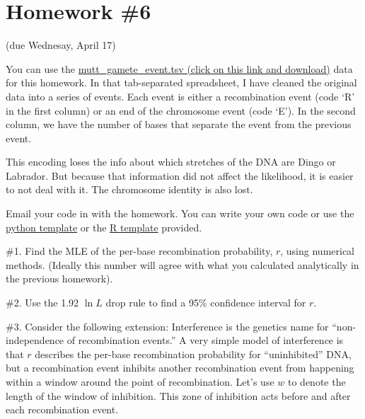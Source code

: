 \documentclass[11pt]{article}
\newcommand{\href}[2]{\url{#2}}
\begin{document}
\section*{Homework \#6} (due Wednesay, April 17)

You can use the \href{https://github.com/mtholder/likelihood-methods-course-2019/raw/master/homework/mutt_gamete_event.tsv}{mutt\_gamete\_event.tsv (click on this link and download)} data for this
homework.
In that tab-separated spreadsheet, I have cleaned the 
    original data into a series of events.
Each event is either a recombination event (code `R' 
    in the first column) or an end of the chromosome
    event (code `E').
In the second column, we have the number of bases
    that separate the event from the previous
    event.

This encoding loses the info about which stretches of the
    DNA are Dingo or Labrador.
But because that information did not affect the likelihood,
    it is easier to not deal with it.
The chromosome identity is also lost.


Email your code in with the homework.
You can write your own code or use the 
    \href{https://github.com/mtholder/likelihood-methods-course-2019/blob/master/homework/hw6-template.py}{python template}
or the 
    \href{https://github.com/mtholder/likelihood-methods-course-2019/blob/master/homework/hw6-template.R}{R template} provided.

\#1. Find the MLE of the per-base recombination probability, $r$, using
numerical methods.
    (Ideally this number will agree with what you calculated analytically
    in the previous homework).


\#2. Use the 1.92 $\ln L$ drop rule to find a 95\% confidence interval
    for $r$.

\#3. Consider the following extension:
Interference is the genetics name for ``non-independence of recombination
    events.''
A very simple model of interference is that 
    $r$ describes the per-base recombination probability for ``uninhibited''
    DNA, but a recombination event inhibits another recombination event
    from happening within a window around the point of recombination.
Let's use $w$ to denote the length of the window of inhibition.
This zone of inhibition acts before and after each recombination event.
\end{document}
